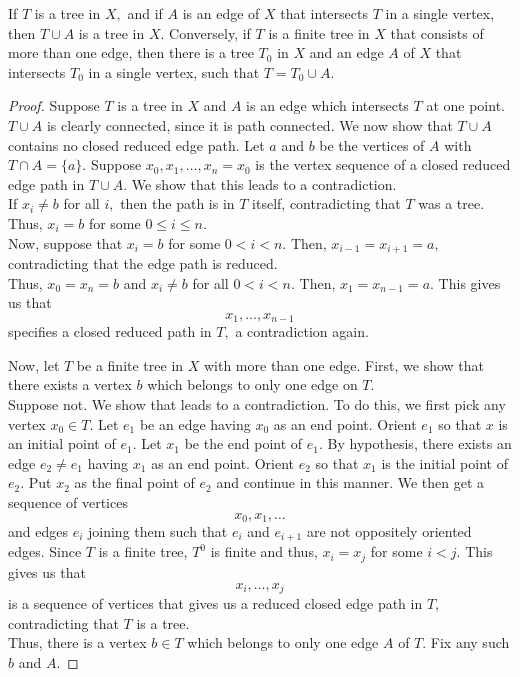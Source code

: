 \documentclass[12pt]{article}
\begin{document}
\begin{prop} \label{prop:treeextendandcut}
	If $T$ is a tree in $X,$ and if $A$ is an edge of $X$ that intersects $T$ in a single vertex, then $T \cup A$ is a tree in $X.$ Conversely, if $T$ is a finite tree in $X$ that consists of more than one edge, then there is a tree $T_0$ in $X$ and an edge $A$ of $X$ that intersects $T_0$ in a single vertex, such that $T = T_0 \cup A.$
\end{prop}
\begin{proof} 
	Suppose $T$ is a tree in $X$ and $A$ is an edge which intersects $T$ at one point. $T \cup A$ is clearly connected, since it is path connected. We now show that $T \cup A$ contains no closed reduced edge path. Let $a$ and $b$ be the vertices of $A$ with $T \cap A = \{a\}.$ Suppose $x_0, x_1, \ldots, x_n = x_0$ is the vertex sequence of a closed reduced edge path in $T \cup A.$ We show that this leads to a contradiction.\\
	If $x_i \neq b$ for all $i,$ then the path is in $T$ itself, contradicting that $T$ was a tree.\\
	Thus, $x_i = b$ for some $0 \le i \le n.$ \\
	Now, suppose that $x_i = b$ for some $0 < i < n.$ Then, $x_{i-1} = x_{i+1}= a,$ contradicting that the edge path is reduced.\\
	Thus, $x_0 = x_n = b$ and $x_i \neq b$ for all $0 < i < n.$ Then, $x_1 = x_{n-1} = a.$ This gives us that
	\begin{equation*} 
		x_1, \ldots, x_{n-1}
	\end{equation*}
	specifies a closed reduced path in $T,$ a contradiction again.

	Now, let $T$ be a finite tree in $X$ with more than one edge. First, we show that there exists a vertex $b$ which belongs to only one edge on $T.$\\
	Suppose not. We show that leads to a contradiction. To do this, we first pick any vertex $x_0 \in T.$ Let $e_1$ be an edge having $x_0$ as an end point. Orient $e_1$ so that $x$ is an initial point of $e_1.$ Let $x_1$ be the end point of $e_1.$ By hypothesis, there exists an edge $e_2 \neq e_1$ having $x_1$ as an end point. Orient $e_2$ so that $x_1$ is the initial point of $e_2.$ Put $x_2$ as the final point of $e_2$ and continue in this manner. We then get a sequence of vertices
	\begin{equation*} 
		x_0, x_1, \ldots
	\end{equation*}
	and edges $e_i$ joining them such that $e_i$ and $e_{i+1}$ are not oppositely oriented edges. Since $T$ is a finite tree, $T^0$ is finite and thus, $x_i = x_j$ for some $i < j.$ This gives us that
	\begin{equation*} 
		x_i, \ldots, x_j
	\end{equation*}
	is a sequence of vertices that gives us a reduced closed edge path in $T,$ contradicting that $T$ is a tree. \\
	Thus, there is a vertex $b \in T$ which belongs to only one edge $A$ of $T.$ Fix any such $b$ and $A.$


\end{proof}
\end{document}
